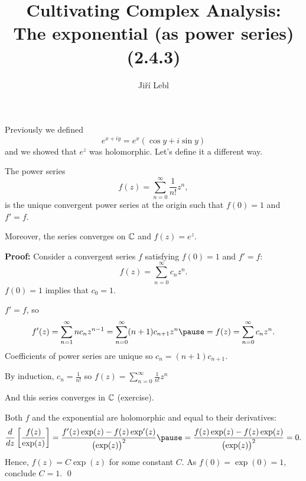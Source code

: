 \documentclass[10pt,aspectratio=169]{beamer}
\author{Ji\v{r}\'i Lebl}
\institute[OSU]{%
Departemento pri Matematiko de Oklahoma {\^S}tata Universitato}
\title{Cultivating Complex Analysis:\\%
The exponential (as power series) (2.4.3)}
\date{}
\begin{document}
\begin{frame}
\titlepage
\end{frame}

\begin{frame}
Previously we defined
\[
e^{x+iy}
= e^x (\cos y + i \sin y)
\]
and we showed that $e^z$ was holomorphic. \pause Let's define it a different
way.

\medskip
\pause

\begin{proposition}
The power series
\begin{equation*}
f(z) = \sum_{n=0}^\infty \frac{1}{n!} z^n ,
\end{equation*}
is the unique convergent power series at the origin
such that $f(0)=1$ and $f'=f$.
\pause

Moreover, the series converges on ${\mathbb{C}}$ and
$f(z) = e^z$.
\end{proposition}

\pause

\textbf{Proof:}
Consider a convergent series $f$ satisfying $f(0)=1$ and $f'=f$:
\[
f(z) = \sum_{n=0}^\infty c_n z^n .
\]
\pause
$f(0)=1$ implies that $c_0 = 1$.

\end{frame}

\begin{frame}
$f' = f$, so  \pause
\[
f'(z) =
\sum_{n=1}^\infty n c_n z^{n-1} =
\sum_{n=0}^\infty (n+1) c_{n+1} z^{n} 
\pause
=
f(z) = \sum_{n=0}^\infty c_n z^n .
\]
\pause
Coefficients of power series are unique  so $c_n = (n+1) c_{n+1}$.

\pause
By induction, $c_n = \frac{1}{n!}$ so
\(\displaystyle f(z) = \sum_{n=0}^\infty \frac{1}{n!} z^n \)

\pause
And this series converges in ${\mathbb{C}}$ (exercise).

\pause
\medskip

Both $f$ and the exponential are holomorphic and equal to their derivatives:
\pause
\[
\frac{d}{dz} \left[ \frac{f(z)}{\exp(z)} \right]
=
\frac{f'(z)\exp(z) - f(z) \exp'(z)}{{\bigl(\exp(z)\bigr)}^2}
\pause
=
\frac{f(z)\exp(z) - f(z) \exp(z)}{{\bigl(\exp(z)\bigr)}^2}
= 0.
\]
\pause
Hence, $f(z) = C \exp(z)$ for some constant $C$.
\pause
As $f(0) = \exp(0) = 1$, conclude $C=1$.
\qed
\end{frame}
\end{document}
